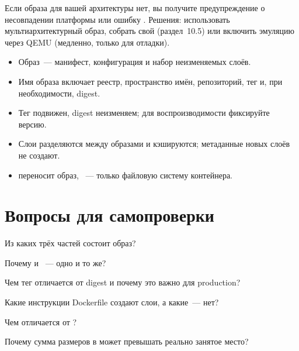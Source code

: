 Если образа для вашей архитектуры нет, вы получите предупреждение
о несовпадении платформы или ошибку . Решения:
использовать мультиархитектурный образ, собрать свой (раздел~10.5)
или включить эмуляцию через QEMU (медленно, только для отладки).

\begin{summarybox}
\begin{itemize}
  \item Образ~--- манифест, конфигурация и набор неизменяемых слоёв.
  \item Имя образа включает реестр, пространство имён, репозиторий, тег
        и, при необходимости, digest.
  \item Тег подвижен, digest неизменяем; для воспроизводимости фиксируйте
        версию.
  \item Слои разделяются между образами и кэшируются; метаданные новых
        слоёв не создают.
  \item {} переносит образ, ~--- только файловую
        систему контейнера.
\end{itemize}
\end{summarybox}

\section*{Вопросы для самопроверки}
\begin{selfcheck}
  \item Из каких трёх частей состоит образ?
  \item Почему  и ~---
        одно и то же?
  \item Чем тег отличается от digest и почему это важно для production?
  \item Какие инструкции Dockerfile создают слои, а какие~--- нет?
  \item Чем  отличается от ?
  \item Почему сумма размеров в  может превышать
        реально занятое место?
\end{selfcheck}
